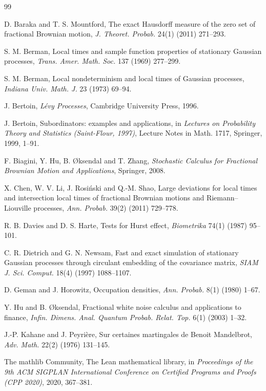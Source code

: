 \documentclass[11pt]{article}
\theoremstyle{remark}
\theoremstyle{definition}
\begin{document}
\begin{thebibliography}{99}\small

 D. Baraka and T. S. Mountford, The exact Hausdorff measure of the zero set of fractional Brownian motion, \emph{J. Theoret. Probab.} 24(1) (2011) 271--293.

 S. M. Berman, Local times and sample function properties of stationary Gaussian processes, \emph{Trans. Amer. Math. Soc.} 137 (1969) 277--299.

 S. M. Berman, Local nondeterminism and local times of Gaussian processes, \emph{Indiana Univ. Math. J.} 23 (1973) 69--94.

 J. Bertoin, \emph{L\'evy Processes}, Cambridge University Press, 1996.

 J. Bertoin, Subordinators: examples and applications, in \emph{Lectures on Probability Theory and Statistics (Saint-Flour, 1997)}, Lecture Notes in Math. 1717, Springer, 1999, 1--91.

 F. Biagini, Y. Hu, B. {\O}ksendal and T. Zhang, \emph{Stochastic Calculus for Fractional Brownian Motion and Applications}, Springer, 2008.

 X. Chen, W. V. Li, J. Rosi\'nski and Q.-M. Shao, Large deviations for local times and intersection local times of fractional Brownian motions and Riemann--Liouville processes, \emph{Ann. Probab.} 39(2) (2011) 729--778.

 R. B. Davies and D. S. Harte, Tests for Hurst effect, \emph{Biometrika} 74(1) (1987) 95--101.

 C. R. Dietrich and G. N. Newsam, Fast and exact simulation of stationary Gaussian processes through circulant embedding of the covariance matrix, \emph{SIAM J. Sci. Comput.} 18(4) (1997) 1088--1107.

 D. Geman and J. Horowitz, Occupation densities, \emph{Ann. Probab.} 8(1) (1980) 1--67.

 Y. Hu and B. {\O}ksendal, Fractional white noise calculus and applications to finance, \emph{Infin. Dimens. Anal. Quantum Probab. Relat. Top.} 6(1) (2003) 1--32.

 J.-P. Kahane and J. Peyri\`ere, Sur certaines martingales de Benoit Mandelbrot, \emph{Adv. Math.} 22(2) (1976) 131--145.

 The mathlib Community, The Lean mathematical library, in \emph{Proceedings of the 9th ACM SIGPLAN International Conference on Certified Programs and Proofs (CPP 2020)}, 2020, 367--381.


\end{thebibliography}
\end{document}
